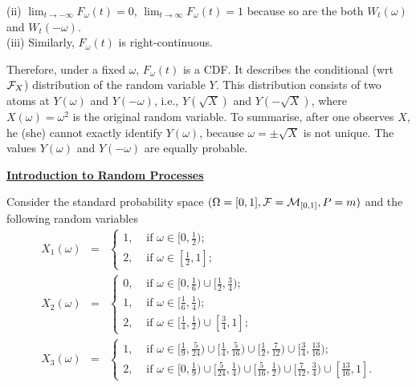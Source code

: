 \documentclass[a4paper,10pt]{article}
\newcommand{\1}[1]{\mathbf{1}_{\{#1\}}}
\begin{document}
\noindent(ii) $\lim_{t\to -\infty} F_\omega(t)=0$, $\lim_{t\to \infty} F_\omega(t)=1$ because so are the both $W_t(\omega)$ and $W_t(-\omega)$.\\
(iii) Similarly, $F_\omega(t)$ is right-continuous. \vspace{3mm}

Therefore, under a fixed $\omega$, $F_\omega(t)$ is a CDF. It describes the conditional (wrt ${\cal F}_X$) distribution of the random variable $Y$. This distribution consists of two atoms at $Y(\omega)$ and $Y(-\omega)$, i.e., $Y(\sqrt{X})$ and $Y(-\sqrt{X})$, where $X(\omega)=\omega^2$ is the original random variable. To summarise, after one observes $X$, he (she) cannot exactly identify $Y(\omega)$, because $\omega=\pm\sqrt{X}$ is not unique. The values $Y(\omega)$ and $Y(-\omega)$ are equally probable.
\vspace{3mm}

\begin{center}\bf\underline{Introduction to Random Processes}\end{center}
\vspace{3mm}

\noindent Consider the standard probability space $(\Omega=[0,1],{\cal F}={\cal M}_{[0,1]}, P=m)$ and the following random variables
\begin{eqnarray*}
X_1(\omega)&=&\left\{\begin{array}{ll}
1, & \mbox{ if } \omega\in[0,\frac{1}{2}); \\
2, & \mbox{ if } \omega\in[\frac{1}{2},1];
\end{array}\right. \\
X_2(\omega)&=&\left\{\begin{array}{ll}
0, & \mbox{ if } \omega\in[0,\frac{1}{6})\cup[\frac{1}{2},\frac{3}{4}); \\
1, & \mbox{ if } \omega\in[\frac{1}{6},\frac{1}{4}); \\
2, & \mbox{ if } \omega\in[\frac{1}{4},\frac{1}{2})\cup[\frac{3}{4},1];
\end{array}\right. \\
X_3(\omega)&=&\left\{\begin{array}{ll}
1, & \mbox{ if } \omega\in[\frac{1}{9},\frac{5}{24})\cup[\frac{1}{4},\frac{5}{16})\cup[\frac{1}{2},\frac{7}{12})\cup [\frac{3}{4},\frac{13}{16}); \\
2, & \mbox{ if } \omega\in[0,\frac{1}{9})\cup[\frac{5}{24},\frac{1}{4})\cup[\frac{5}{16},\frac{1}{2})\cup [\frac{7}{12},\frac{3}{4})\cup[\frac{13}{16},1].
\end{array}\right.
\end{eqnarray*}
\end{document}
